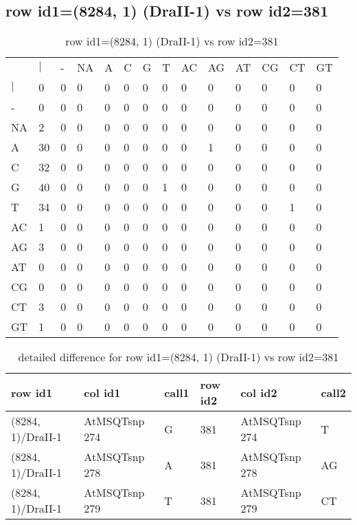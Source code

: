 \subsection{row id1=(8284, 1) (DraII-1) vs row id2=381}
\begin{center}
\begin{longtable}{|l|l|l|l|l|l|l|l|l|l|l|l|l|l|}
\caption{row id1=(8284, 1) (DraII-1) vs row id2=381} \label{table_dm444}\\
\hline
\\
\hline
&$|$&-&NA&A&C&G&T&AC&AG&AT&CG&CT&GT\\
$|$&0&0&0&0&0&0&0&0&0&0&0&0&0\\
-&0&0&0&0&0&0&0&0&0&0&0&0&0\\
NA&2&0&0&0&0&0&0&0&0&0&0&0&0\\
A&30&0&0&0&0&0&0&0&1&0&0&0&0\\
C&32&0&0&0&0&0&0&0&0&0&0&0&0\\
G&40&0&0&0&0&0&1&0&0&0&0&0&0\\
T&34&0&0&0&0&0&0&0&0&0&0&1&0\\
AC&1&0&0&0&0&0&0&0&0&0&0&0&0\\
AG&3&0&0&0&0&0&0&0&0&0&0&0&0\\
AT&0&0&0&0&0&0&0&0&0&0&0&0&0\\
CG&0&0&0&0&0&0&0&0&0&0&0&0&0\\
CT&3&0&0&0&0&0&0&0&0&0&0&0&0\\
GT&1&0&0&0&0&0&0&0&0&0&0&0&0\\
\hline
\end{longtable}
\end{center}

\begin{center}
\begin{longtable}{|l|l|l|l|l|l|}
\caption{detailed difference for row id1=(8284, 1) (DraII-1) vs row id2=381} \label{table_dm445}\\
\hline
row id1&col id1&call1&row id2&col id2&call2\\
\hline
(8284, 1)/DraII-1&AtMSQTsnp 274&G&381&AtMSQTsnp 274&T\\
(8284, 1)/DraII-1&AtMSQTsnp 278&A&381&AtMSQTsnp 278&AG\\
(8284, 1)/DraII-1&AtMSQTsnp 279&T&381&AtMSQTsnp 279&CT\\
\hline
\end{longtable}
\end{center}

